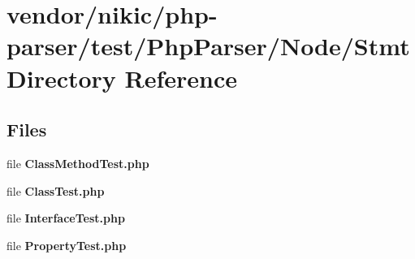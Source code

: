 \section{vendor/nikic/php-\/parser/test/\+Php\+Parser/\+Node/\+Stmt Directory Reference}
\label{dir_f3dcf42ad8c3c48960260ffab73ebf4c}
\subsection*{Files}
\begin{DoxyCompactItemize}
\item 
file {\bf Class\+Method\+Test.\+php}
\item 
file {\bf Class\+Test.\+php}
\item 
file {\bf Interface\+Test.\+php}
\item 
file {\bf Property\+Test.\+php}
\end{DoxyCompactItemize}
